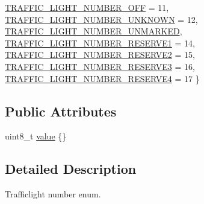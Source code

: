 \begin{DoxyCompactItemize}
\hyperlink{structmaf__perception__interface_1_1TrafficLightNumberEnum_a984f1ce04637f5727b1cefbd3b86d6aeafdab3aedf881e05514cd0598ce30fee8}{T\+R\+A\+F\+F\+I\+C\+\_\+\+L\+I\+G\+H\+T\+\_\+\+N\+U\+M\+B\+E\+R\+\_\+\+O\+FF} = 11, 
\newline
\hyperlink{structmaf__perception__interface_1_1TrafficLightNumberEnum_a984f1ce04637f5727b1cefbd3b86d6aeab8bc82a0dd748b40c6e131055339ffc0}{T\+R\+A\+F\+F\+I\+C\+\_\+\+L\+I\+G\+H\+T\+\_\+\+N\+U\+M\+B\+E\+R\+\_\+\+U\+N\+K\+N\+O\+WN} = 12, 
\hyperlink{structmaf__perception__interface_1_1TrafficLightNumberEnum_a984f1ce04637f5727b1cefbd3b86d6aeacc85e9abc0e4e9e90ebc2c701e9998b8}{T\+R\+A\+F\+F\+I\+C\+\_\+\+L\+I\+G\+H\+T\+\_\+\+N\+U\+M\+B\+E\+R\+\_\+\+U\+N\+M\+A\+R\+K\+ED}, 
\hyperlink{structmaf__perception__interface_1_1TrafficLightNumberEnum_a984f1ce04637f5727b1cefbd3b86d6aea5da985b63823ebdb0d9873978daa1709}{T\+R\+A\+F\+F\+I\+C\+\_\+\+L\+I\+G\+H\+T\+\_\+\+N\+U\+M\+B\+E\+R\+\_\+\+R\+E\+S\+E\+R\+V\+E1} = 14, 
\hyperlink{structmaf__perception__interface_1_1TrafficLightNumberEnum_a984f1ce04637f5727b1cefbd3b86d6aea67cf72e3a5bbf05118f4b60ce1887e85}{T\+R\+A\+F\+F\+I\+C\+\_\+\+L\+I\+G\+H\+T\+\_\+\+N\+U\+M\+B\+E\+R\+\_\+\+R\+E\+S\+E\+R\+V\+E2} = 15, 
\newline
\hyperlink{structmaf__perception__interface_1_1TrafficLightNumberEnum_a984f1ce04637f5727b1cefbd3b86d6aeac324642ca7fae7e00745bf32752cf65d}{T\+R\+A\+F\+F\+I\+C\+\_\+\+L\+I\+G\+H\+T\+\_\+\+N\+U\+M\+B\+E\+R\+\_\+\+R\+E\+S\+E\+R\+V\+E3} = 16, 
\hyperlink{structmaf__perception__interface_1_1TrafficLightNumberEnum_a984f1ce04637f5727b1cefbd3b86d6aead46697db81ef45251551bd20c67068e5}{T\+R\+A\+F\+F\+I\+C\+\_\+\+L\+I\+G\+H\+T\+\_\+\+N\+U\+M\+B\+E\+R\+\_\+\+R\+E\+S\+E\+R\+V\+E4} = 17
 \}
\end{DoxyCompactItemize}
\subsection*{Public Attributes}
\begin{DoxyCompactItemize}
\item 
uint8\+\_\+t \hyperlink{structmaf__perception__interface_1_1TrafficLightNumberEnum_a1d8cd30684d0c3b488e54d867bcb08e3}{value} \{\}
\end{DoxyCompactItemize}


\subsection{Detailed Description}
Trafficlight number enum. 

